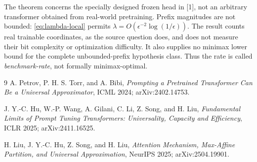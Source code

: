 \documentclass[11pt]{article}
\begin{document}
The theorem concerns the specially designed frozen head in [1], not an
arbitrary transformer obtained from real-world pretraining.  Prefix magnitudes
are not bounded: \eqref{eq:lambda-local} permits
$\lambda=O(\epsilon^{-2}\log(1/\epsilon))$.  The result counts real trainable
coordinates, as the source question does, and does not measure their bit
complexity or optimization difficulty.  It also supplies no minimax lower
bound for the complete unbounded-prefix hypothesis class.  Thus the rate is
called \emph{benchmark-rate}, not formally minimax-optimal.

\begin{thebibliography}{9}
A. Petrov, P. H. S. Torr, and A. Bibi,
\emph{Prompting a Pretrained Transformer Can Be a Universal Approximator},
ICML 2024; arXiv:2402.14753.

J. Y.-C. Hu, W.-P. Wang, A. Gilani, C. Li, Z. Song, and H. Liu,
\emph{Fundamental Limits of Prompt Tuning Transformers: Universality,
Capacity and Efficiency}, ICLR 2025; arXiv:2411.16525.

H. Liu, J. Y.-C. Hu, Z. Song, and H. Liu,
\emph{Attention Mechanism, Max-Affine Partition, and Universal
Approximation}, NeurIPS 2025; arXiv:2504.19901.
\end{thebibliography}
\end{document}
